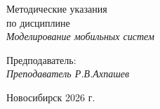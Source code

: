 \thispagestyle{empty}






\vfill

\begin{center}
    Методические указания \\  
    по дисциплине \\
    \textit{Моделирование мобильных систем}

    \vspace{20pt}

\end{center}

\vfill

    \noindent Предподаватель: \\
    \textit{Преподаватель \hfill Р.В.Ахпашев}

\vfill

\begin{center}
    Новосибирск 2026 г.
\end{center}